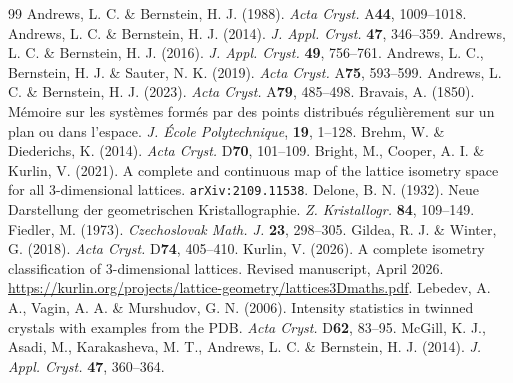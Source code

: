 \documentclass[11pt]{article}
\begin{document}
\begin{thebibliography}{99}
\small
{} Andrews, L. C. \& Bernstein, H. J. (1988). \textit{Acta Cryst.} A\textbf{44}, 1009--1018.
 Andrews, L. C. \& Bernstein, H. J. (2014). \textit{J. Appl. Cryst.} \textbf{47}, 346--359.
 Andrews, L. C. \& Bernstein, H. J. (2016). \textit{J. Appl. Cryst.} \textbf{49}, 756--761.
 Andrews, L. C., Bernstein, H. J. \& Sauter, N. K. (2019). \textit{Acta Cryst.} A\textbf{75}, 593--599.
 Andrews, L. C. \& Bernstein, H. J. (2023). \textit{Acta Cryst.} A\textbf{79}, 485--498.
 Bravais, A. (1850). M\'emoire sur les syst\`emes form\'es par des points distribu\'es r\'eguli\`erement sur un plan ou dans l'espace. \textit{J. \'{E}cole Polytechnique}, \textbf{19}, 1--128.
 Brehm, W. \& Diederichs, K. (2014). \textit{Acta Cryst.} D\textbf{70}, 101--109.
 Bright, M., Cooper, A. I. \& Kurlin, V. (2021). A complete and continuous map of the lattice isometry space for all 3-dimensional lattices. \texttt{arXiv:2109.11538}.
 Delone, B. N. (1932). Neue Darstellung der geometrischen Kristallographie. \textit{Z. Kristallogr.} \textbf{84}, 109--149.
 Fiedler, M. (1973). \textit{Czechoslovak Math. J.} \textbf{23}, 298--305.
 Gildea, R. J. \& Winter, G. (2018). \textit{Acta Cryst.} D\textbf{74}, 405--410.
 Kurlin, V. (2026). A complete isometry classification of 3-dimensional lattices. Revised manuscript, April 2026. \url{https://kurlin.org/projects/lattice-geometry/lattices3Dmaths.pdf}.
 Lebedev, A. A., Vagin, A. A. \& Murshudov, G. N. (2006). Intensity statistics in twinned crystals with examples from the PDB. \textit{Acta Cryst.} D\textbf{62}, 83--95.
 McGill, K. J., Asadi, M., Karakasheva, M. T., Andrews, L. C. \& Bernstein, H. J. (2014). \textit{J. Appl. Cryst.} \textbf{47}, 360--364.
\end{thebibliography}
\end{document}
